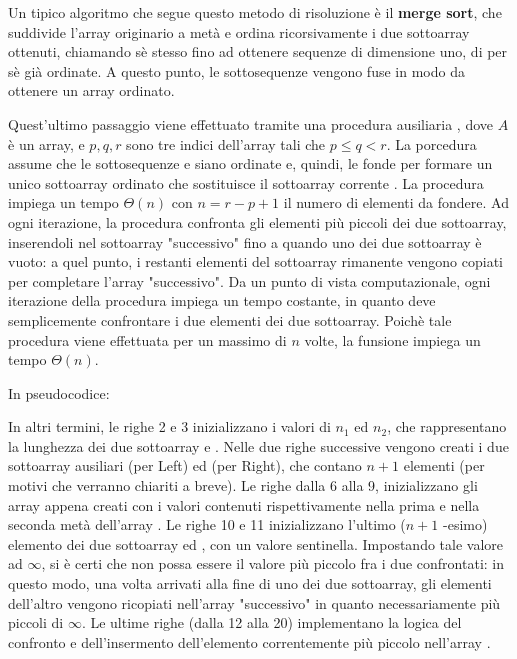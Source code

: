 Un tipico algoritmo che segue questo metodo di risoluzione è il \textbf{merge sort}, che suddivide l'array originario a metà e ordina ricorsivamente i due sottoarray ottenuti, chiamando sè stesso fino ad ottenere sequenze di dimensione uno, di per sè già ordinate. A questo punto, le sottosequenze vengono fuse in modo da ottenere un array ordinato. 

Quest'ultimo passaggio viene effettuato tramite una procedura ausiliaria , dove \(A\) è un array, e \(p,q,r\) sono tre indici dell'array tali che \(p\le q < r\).
La porcedura assume che le sottosequenze  e  siano ordinate e, quindi, le fonde per formare un unico sottoarray ordinato che sostituisce il sottoarray corrente . La procedura  impiega un tempo \(\Theta(n)\) con \(n=r-p+1\) il numero di elementi da fondere. Ad ogni iterazione, la procedura  confronta gli elementi più piccoli dei due sottoarray, inserendoli nel sottoarray "successivo" fino a quando uno dei due sottoarray è vuoto: a quel punto, i restanti elementi del sottoarray rimanente vengono copiati per completare l'array "successivo". Da un punto di vista computazionale, ogni iterazione della procedura impiega un tempo costante, in quanto deve semplicemente confrontare i due elementi dei due sottoarray. Poichè tale procedura viene effettuata per un massimo di \(n\) volte, la funsione impiega un tempo \(\Theta(n)\).

\vspace{1in}

In pseudocodice:



\noindent
In altri termini, le righe 2 e 3 inizializzano i valori di \(n_1\) ed \(n_2\), che rappresentano la lunghezza dei due sottoarray  e . Nelle due righe successive vengono creati i due sottoarray ausiliari  (per Left) ed  (per Right), che contano \(n+1\) elementi (per motivi che verranno chiariti a breve). Le righe dalla 6 alla 9, inizializzano gli array appena creati con i valori contenuti rispettivamente nella prima e nella seconda metà dell'array . Le righe 10 e 11 inizializzano l'ultimo (\(n+1\) -esimo) elemento dei due sottoarray  ed , con un valore sentinella. Impostando tale valore ad \(\infty\), si è certi che non possa essere il valore più piccolo fra i due confrontati: in questo modo, una volta arrivati alla fine di uno dei due sottoarray, gli elementi dell'altro vengono ricopiati nell'array "successivo" in quanto necessariamente più piccoli di \(\infty\). Le ultime righe (dalla 12 alla 20) implementano la logica del confronto e dell'insermento dell'elemento correntemente più piccolo nell'array .

